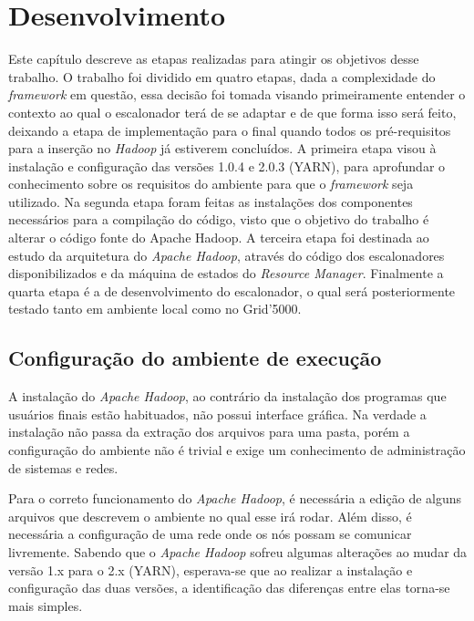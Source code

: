 \chapter{Desenvolvimento}
Este capítulo descreve as etapas realizadas para atingir os objetivos desse trabalho. O trabalho foi dividido em quatro etapas, dada a complexidade do \emph{framework} em questão, essa decisão foi tomada visando primeiramente entender o contexto ao qual o escalonador terá de se adaptar e de que forma isso será feito, deixando a etapa de implementação para o final quando todos os pré-requisitos para a inserção no \emph{Hadoop} já estiverem concluídos. A primeira etapa visou à instalação e configuração das versões 1.0.4 e 2.0.3 (YARN), para aprofundar o conhecimento sobre os requisitos do ambiente para que o \emph{framework} seja utilizado. Na segunda etapa foram feitas as instalações dos componentes necessários para a compilação do código, visto que o objetivo do trabalho é alterar o código fonte do Apache Hadoop. A terceira etapa foi destinada ao estudo da arquitetura do \emph{Apache Hadoop}, através do código dos escalonadores disponibilizados e da máquina de estados do \emph{Resource Manager}. Finalmente a quarta etapa é a de desenvolvimento do escalonador, o qual será posteriormente testado tanto em ambiente local como no Grid'5000.

\section{Configuração do ambiente de execução}
A instalação do \emph{Apache Hadoop}, ao contrário da instalação dos programas que usuários finais estão habituados, não possui interface gráfica. Na verdade a instalação não passa da extração dos arquivos para uma pasta, porém a configuração do ambiente não é trivial e exige um conhecimento de administração de sistemas e redes. 

Para o correto funcionamento do \emph{Apache Hadoop}, é necessária a edição de alguns arquivos que descrevem o ambiente no qual esse irá rodar. Além disso, é necessária a configuração de uma rede onde os nós possam se comunicar livremente. Sabendo que o \emph{Apache Hadoop} sofreu algumas alterações ao mudar da versão 1.x para o 2.x (YARN), esperava-se que ao realizar a instalação e configuração das duas versões, a identificação das diferenças entre elas torna-se mais simples.

